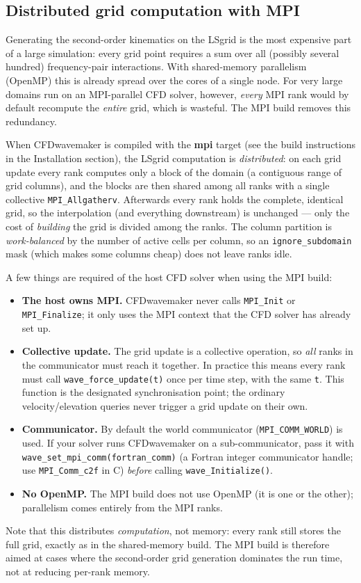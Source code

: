 \documentclass{ol-softwaremanual}
\begin{document}
\subsection{Distributed grid computation with MPI}\label{sec:mpi}
Generating the second-order kinematics on the LSgrid is the most expensive part of a large simulation: every grid point requires a sum over all (possibly several hundred) frequency-pair interactions. With shared-memory parallelism (OpenMP) this is already spread over the cores of a single node. For very large domains run on an MPI-parallel CFD solver, however, \emph{every} MPI rank would by default recompute the \emph{entire} grid, which is wasteful. The MPI build removes this redundancy.

When CFDwavemaker is compiled with the \textbf{mpi} target (see the build instructions in the Installation section), the LSgrid computation is \emph{distributed}: on each grid update every rank computes only a block of the domain (a contiguous range of grid columns), and the blocks are then shared among all ranks with a single collective \texttt{MPI\_Allgatherv}. Afterwards every rank holds the complete, identical grid, so the interpolation (and everything downstream) is unchanged --- only the cost of \emph{building} the grid is divided among the ranks. The column partition is \emph{work-balanced} by the number of active cells per column, so an \texttt{ignore\_subdomain} mask (which makes some columns cheap) does not leave ranks idle.

A few things are required of the host CFD solver when using the MPI build:
\begin{itemize}
    \item \textbf{The host owns MPI.} CFDwavemaker never calls \texttt{MPI\_Init} or \texttt{MPI\_Finalize}; it only uses the MPI context that the CFD solver has already set up.
    \item \textbf{Collective update.} The grid update is a collective operation, so \emph{all} ranks in the communicator must reach it together. In practice this means every rank must call \texttt{wave\_force\_update(t)} once per time step, with the same \texttt{t}. This function is the designated synchronisation point; the ordinary velocity/elevation queries never trigger a grid update on their own.
    \item \textbf{Communicator.} By default the world communicator (\texttt{MPI\_COMM\_WORLD}) is used. If your solver runs CFDwavemaker on a sub-communicator, pass it with \texttt{wave\_set\_mpi\_comm(fortran\_comm)} (a Fortran integer communicator handle; use \texttt{MPI\_Comm\_c2f} in C) \emph{before} calling \texttt{wave\_Initialize()}.
    \item \textbf{No OpenMP.} The MPI build does not use OpenMP (it is one or the other); parallelism comes entirely from the MPI ranks.
\end{itemize}
Note that this distributes \emph{computation}, not memory: every rank still stores the full grid, exactly as in the shared-memory build. The MPI build is therefore aimed at cases where the second-order grid generation dominates the run time, not at reducing per-rank memory.
\end{document}
